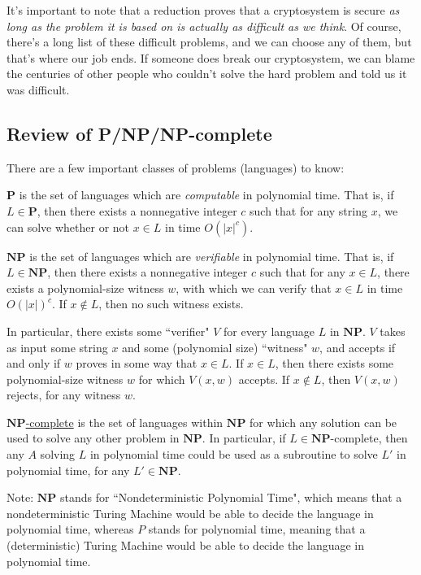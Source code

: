 \documentclass[11pt]{article}
\renewcommand{\P}{\mathbf{P}}
\newcommand{\NP}{\mathbf{NP}}
\begin{document}
It's important to note that a reduction proves that a cryptosystem is secure \emph{as long as the problem it is based on is actually as difficult as we think}. Of course, there's a long list of these difficult problems, and we can choose any of them, but that's where our job ends. If someone does break our cryptosystem, we can blame the centuries of other people who couldn't solve the hard problem and told us it was difficult.


\subsection{Review of P/NP/NP-complete}

There are a few important classes of problems (languages) to know:\bigskip

\underline{\(\P\)} is the set of languages which are \emph{computable} in polynomial time.  That is, if \(L\in\P\), then there exists a nonnegative integer \(c\) such that for any string \(x\), we can solve whether or not \(x\in L\) in time \(O(|x|^c)\).\medskip

\underline{\(\NP\)} is the set of languages which are \emph{verifiable} in polynomial time. That is, if \(L\in\NP\), then there exists a nonnegative integer \(c\) such that for any \(x\in L\), there exists a polynomial-size witness \(w\), with which we can verify that \(x\in L\) in time \(O(|x|)^c\). If \(x\notin L\), then no such witness exists. 

In particular, there exists some ``verifier" \(V\) for every language \(L\) in \(\NP\). \(V\) takes as input some string \(x\) and some (polynomial size) ``witness" \(w\), and accepts if and only if \(w\) proves in some way that \(x\in L\). If \(x\in L\), then there exists some polynomial-size witness \(w\) for which \(V(x,w)\) accepts. If \(x\notin L\), then \(V(x,w)\) rejects, for any witness \(w\).\medskip

\underline{\(\NP\)-complete} is the set of languages within \(\NP\) for which any solution can be used to solve any other problem in \(\NP\). In particular, if \(L\in\NP\)-complete, then any \(A\) solving \(L\) in polynomial time could be used as a subroutine to solve \(L'\) in polynomial time, for any \(L'\in\NP\).\bigskip

Note: \(\NP\) stands for ``Nondeterministic Polynomial Time", which means that a nondeterministic Turing Machine would be able to decide the language in polynomial time, whereas \(P\) stands for polynomial time, meaning that a (deterministic) Turing Machine would be able to decide the language in polynomial time. 
\end{document}
